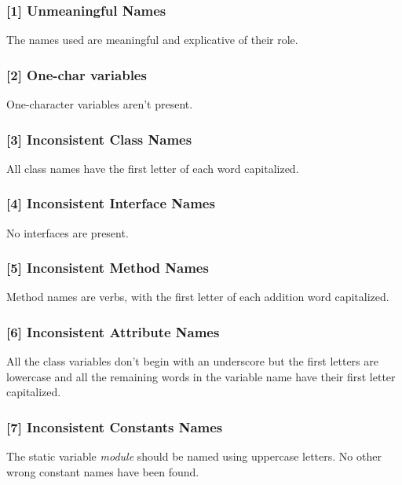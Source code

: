 \subsubsection{[1] Unmeaningful Names}
The names used are meaningful and explicative of their role.


\subsubsection{[2] One-char variables}
One-character variables aren't present.

\subsubsection{[3] Inconsistent Class Names}
All class names have the first letter of each word capitalized. 

\subsubsection{[4] Inconsistent Interface Names}
No interfaces are present.

\subsubsection{[5] Inconsistent Method Names}
Method names are verbs, with the first letter of each addition word capitalized.

\subsubsection{[6] Inconsistent Attribute Names}
All the class variables don't begin with an underscore but the first letters are lowercase and all the remaining words in the variable name have their first letter capitalized.

\subsubsection{[7] Inconsistent Constants Names}
The static variable \textit{module} should be named using uppercase letters.
No other wrong constant names have been found.